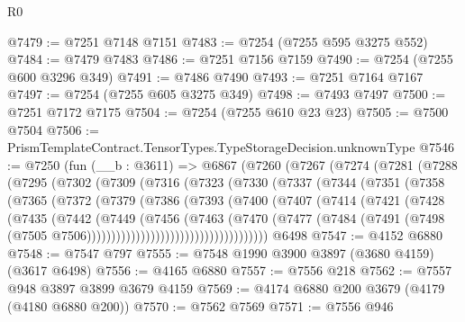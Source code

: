 \begin{lexlean}{R0}
\begin{coremodule}
@7479 := @7251 @7148 @7151
@7483 := @7254 (@7255 @595 @3275 @552)
@7484 := @7479 @7483
@7486 := @7251 @7156 @7159
@7490 := @7254 (@7255 @600 @3296 @349)
@7491 := @7486 @7490
@7493 := @7251 @7164 @7167
@7497 := @7254 (@7255 @605 @3275 @349)
@7498 := @7493 @7497
@7500 := @7251 @7172 @7175
@7504 := @7254 (@7255 @610 @23 @23)
@7505 := @7500 @7504
@7506 := PrismTemplateContract.TensorTypes.TypeStorageDecision.unknownType
@7546 := @7250
    (fun (__b : @3611) =>
    @6867
      (@7260
        (@7267
          (@7274
            (@7281
              (@7288
                (@7295
                  (@7302
                    (@7309
                      (@7316
                        (@7323
                          (@7330
                            (@7337
                              (@7344
                                (@7351
                                  (@7358
                                    (@7365
                                      (@7372
                                        (@7379
                                          (@7386
                                            (@7393
                                              (@7400
                                                (@7407
                                                  (@7414
                                                    (@7421
                                                      (@7428
                                                        (@7435
                                                          (@7442
                                                            (@7449
                                                              (@7456
                                                                (@7463
                                                                  (@7470
                                                                    (@7477
                                                                      (@7484
                                                                        (@7491
                                                                          (@7498
                                                                            (@7505
                                                                              @7506)))))))))))))))))))))))))))))))))))))
    @6498
@7547 := @4152 @6880
@7548 := @7547 @797
@7555 := @7548 @1990 @3900 @3897 (@3680 @4159) (@3617 @6498)
@7556 := @4165 @6880
@7557 := @7556 @218
@7562 := @7557 @948 @3897 @3899 @3679 @4159
@7569 := @4174 @6880 @200 @3679 (@4179 (@4180 @6880 @200))
@7570 := @7562 @7569
@7571 := @7556 @946

\end{coremodule}
\end{lexlean}

